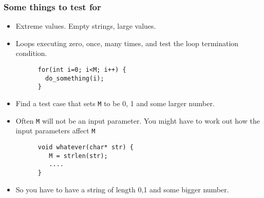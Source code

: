 \documentclass{beamer}
\begin{document}
\begin{frame}[fragile]
  \frametitle{Some things to test for}
  \begin{itemize}
  \item Extreme values. Empty strings, large values.
  \item Loops executing zero, once, many times, and test the loop
    termination condition.
    \begin{lstlisting}
      for(int i=0; i<M; i++) {
        do_something(i);
      }
    \end{lstlisting}
 \item  Find a test case that sets {\tt M} to be 0, 1 and some larger
   number. 
 \item Often {\tt M} will not be an input parameter. You might have to
   work out how the input parameters affect {\tt M}
   \begin{lstlisting}
      void whatever(char* str) {
         M = strlen(str); 
         .... 
      }
   \end{lstlisting}
\item  So you have to have a string  of length 0,1 and some bigger number.
  \end{itemize}
\end{frame}
\end{document}
